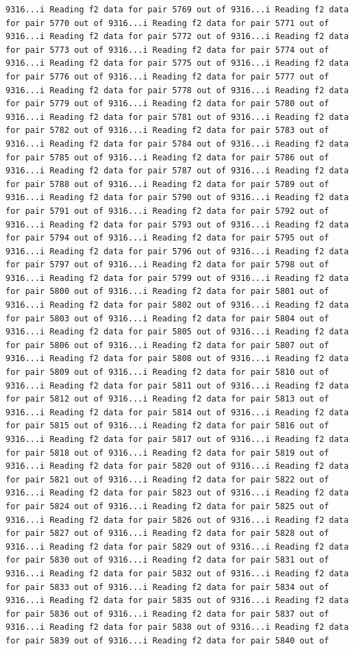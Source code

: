 \documentclass[
]{article}
\begin{document}
\begin{verbatim}
9316...i Reading f2 data for pair 5769 out of 9316...i Reading f2 data for pair 5770 out of 9316...i Reading f2 data for pair 5771 out of 9316...i Reading f2 data for pair 5772 out of 9316...i Reading f2 data for pair 5773 out of 9316...i Reading f2 data for pair 5774 out of 9316...i Reading f2 data for pair 5775 out of 9316...i Reading f2 data for pair 5776 out of 9316...i Reading f2 data for pair 5777 out of 9316...i Reading f2 data for pair 5778 out of 9316...i Reading f2 data for pair 5779 out of 9316...i Reading f2 data for pair 5780 out of 9316...i Reading f2 data for pair 5781 out of 9316...i Reading f2 data for pair 5782 out of 9316...i Reading f2 data for pair 5783 out of 9316...i Reading f2 data for pair 5784 out of 9316...i Reading f2 data for pair 5785 out of 9316...i Reading f2 data for pair 5786 out of 9316...i Reading f2 data for pair 5787 out of 9316...i Reading f2 data for pair 5788 out of 9316...i Reading f2 data for pair 5789 out of 9316...i Reading f2 data for pair 5790 out of 9316...i Reading f2 data for pair 5791 out of 9316...i Reading f2 data for pair 5792 out of 9316...i Reading f2 data for pair 5793 out of 9316...i Reading f2 data for pair 5794 out of 9316...i Reading f2 data for pair 5795 out of 9316...i Reading f2 data for pair 5796 out of 9316...i Reading f2 data for pair 5797 out of 9316...i Reading f2 data for pair 5798 out of 9316...i Reading f2 data for pair 5799 out of 9316...i Reading f2 data for pair 5800 out of 9316...i Reading f2 data for pair 5801 out of 9316...i Reading f2 data for pair 5802 out of 9316...i Reading f2 data for pair 5803 out of 9316...i Reading f2 data for pair 5804 out of 9316...i Reading f2 data for pair 5805 out of 9316...i Reading f2 data for pair 5806 out of 9316...i Reading f2 data for pair 5807 out of 9316...i Reading f2 data for pair 5808 out of 9316...i Reading f2 data for pair 5809 out of 9316...i Reading f2 data for pair 5810 out of 9316...i Reading f2 data for pair 5811 out of 9316...i Reading f2 data for pair 5812 out of 9316...i Reading f2 data for pair 5813 out of 9316...i Reading f2 data for pair 5814 out of 9316...i Reading f2 data for pair 5815 out of 9316...i Reading f2 data for pair 5816 out of 9316...i Reading f2 data for pair 5817 out of 9316...i Reading f2 data for pair 5818 out of 9316...i Reading f2 data for pair 5819 out of 9316...i Reading f2 data for pair 5820 out of 9316...i Reading f2 data for pair 5821 out of 9316...i Reading f2 data for pair 5822 out of 9316...i Reading f2 data for pair 5823 out of 9316...i Reading f2 data for pair 5824 out of 9316...i Reading f2 data for pair 5825 out of 9316...i Reading f2 data for pair 5826 out of 9316...i Reading f2 data for pair 5827 out of 9316...i Reading f2 data for pair 5828 out of 9316...i Reading f2 data for pair 5829 out of 9316...i Reading f2 data for pair 5830 out of 9316...i Reading f2 data for pair 5831 out of 9316...i Reading f2 data for pair 5832 out of 9316...i Reading f2 data for pair 5833 out of 9316...i Reading f2 data for pair 5834 out of 9316...i Reading f2 data for pair 5835 out of 9316...i Reading f2 data for pair 5836 out of 9316...i Reading f2 data for pair 5837 out of 9316...i Reading f2 data for pair 5838 out of 9316...i Reading f2 data for pair 5839 out of 9316...i Reading f2 data for pair 5840 out of 
\end{verbatim}
\end{document}
